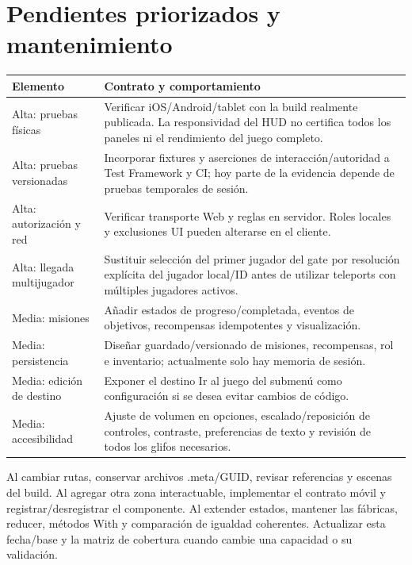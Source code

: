 \documentclass[11pt,letterpaper,oneside]{article}
\makeatletter
\newenvironment{spec}{\begingroup\small\begin{longtable}{@{}>{\raggedright\arraybackslash}p{0.32\textwidth}>{\raggedright\arraybackslash}p{0.64\textwidth}@{}}\toprule\textbf{Elemento} & \textbf{Contrato y comportamiento} \\ \midrule\endhead}{\bottomrule\end{longtable}\endgroup}
\makeatother
\begin{document}
\clearpage
\section{Pendientes priorizados y mantenimiento}
\begin{spec}
Alta: pruebas físicas & Verificar iOS/Android/tablet con la build realmente publicada. La responsividad del HUD no certifica todos los paneles ni el rendimiento del juego completo. \\
Alta: pruebas versionadas & Incorporar fixtures y aserciones de interacción/autoridad a Test Framework y CI; hoy parte de la evidencia depende de pruebas temporales de sesión. \\
Alta: autorización y red & Verificar transporte Web y reglas en servidor. Roles locales y exclusiones UI pueden alterarse en el cliente. \\
Alta: llegada multijugador & Sustituir selección del primer jugador del gate por resolución explícita del jugador local/ID antes de utilizar teleports con múltiples jugadores activos. \\
Media: misiones & Añadir estados de progreso/completada, eventos de objetivos, recompensas idempotentes y visualización. \\
Media: persistencia & Diseñar guardado/versionado de misiones, recompensas, rol e inventario; actualmente solo hay memoria de sesión. \\
Media: edición de destino & Exponer el destino Ir al juego del submenú como configuración si se desea evitar cambios de código. \\
Media: accesibilidad & Ajuste de volumen en opciones, escalado/reposición de controles, contraste, preferencias de texto y revisión de todos los glifos necesarios. \\
\end{spec}
Al cambiar rutas, conservar archivos .meta/GUID, revisar referencias y escenas del build. Al agregar otra zona interactuable, implementar el contrato móvil y registrar/desregistrar el componente. Al extender estados, mantener las fábricas, reducer, métodos With y comparación de igualdad coherentes. Actualizar esta fecha/base y la matriz de cobertura cuando cambie una capacidad o su validación.
\end{document}
